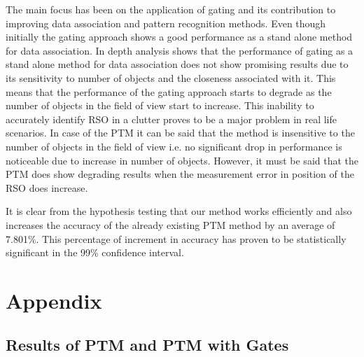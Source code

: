 \documentclass[]{aiaa-tc}%
\begin{document}
The main focus has been on the application of gating and its contribution to improving data association and pattern recognition methods. Even though initially the gating approach shows a good performance as a stand alone method for data association. In depth analysis shows that the performance of gating as a stand alone method for data association does not show promising results due to its sensitivity to number of objects and the closeness associated with it. This means that  the performance of the gating approach starts to degrade as the number of objects in the field of view start to increase. This inability to accurately identify RSO in a clutter proves to be a major problem in real life scenarios. In case of the PTM it can be said that the method is insensitive to the number of objects in the field of view i.e. no significant drop in performance is noticeable due to increase in number of objects. However, it must be said that the PTM does show degrading results when the measurement error in position of the RSO does increase.

It is clear from the hypothesis testing that our method works efficiently and also increases the accuracy of the already existing PTM method by an average of 7.801\%. This percentage of increment in accuracy has proven to be statistically significant in the 99\% confidence interval.







\section*{Appendix}
\subsection{Results of PTM and PTM with Gates}
\end{document}
